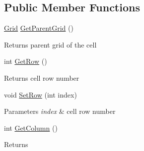 \subsection*{Public Member Functions}
\begin{DoxyCompactItemize}
\item 
\mbox{\label{class_space_v_i_l_1_1_cell_ab4b459e1749d33d8e9d7498437bb3621}} 
\mbox{\hyperlink{class_space_v_i_l_1_1_grid}{Grid}} \mbox{\hyperlink{class_space_v_i_l_1_1_cell_ab4b459e1749d33d8e9d7498437bb3621}{Get\+Parent\+Grid}} ()
\begin{DoxyCompactList}\small\item\em \begin{DoxyReturn}{Returns}
parent grid of the cell 
\end{DoxyReturn}
\end{DoxyCompactList}\item 
\mbox{\label{class_space_v_i_l_1_1_cell_a3f66c9f38e3c8bc2c5bbb0d2997591f5}} 
int \mbox{\hyperlink{class_space_v_i_l_1_1_cell_a3f66c9f38e3c8bc2c5bbb0d2997591f5}{Get\+Row}} ()
\begin{DoxyCompactList}\small\item\em \begin{DoxyReturn}{Returns}
cell row number 
\end{DoxyReturn}
\end{DoxyCompactList}\item 
\mbox{\label{class_space_v_i_l_1_1_cell_afe9e40389b0ba88d38eceb1fd2059ee7}} 
void \mbox{\hyperlink{class_space_v_i_l_1_1_cell_afe9e40389b0ba88d38eceb1fd2059ee7}{Set\+Row}} (int index)
\begin{DoxyCompactList}\small\item\em 
\begin{DoxyParams}{Parameters}
{\em index} & cell row number \\
\hline
\end{DoxyParams}
\end{DoxyCompactList}\item 
\mbox{\label{class_space_v_i_l_1_1_cell_a2c8d20aff183d96cd218636321fa0f1e}} 
int \mbox{\hyperlink{class_space_v_i_l_1_1_cell_a2c8d20aff183d96cd218636321fa0f1e}{Get\+Column}} ()
\begin{DoxyCompactList}\small\item\em \begin{DoxyReturn}{Returns}

\end{DoxyReturn}
\end{DoxyCompactList}
\end{DoxyCompactItemize}
